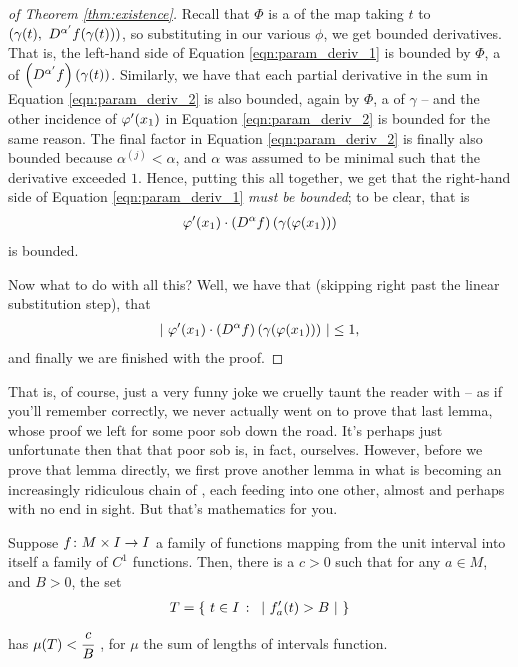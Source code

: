 \begin{proof}[of Theorem \ref{thm:existence}]
    Recall that $\Phi$ is a \cellrparam of the map taking $t$ to $(\gamma(t), \ D^{\alpha^{\prime}} f(\gamma(t)))$, so substituting in our various $\phi$, we get bounded derivatives. That is, the left-hand side of Equation \ref{eqn:param_deriv_1} is bounded by $\Phi$, a \cellrparam of $\left( D^{\alpha^{\prime}} f \right)(\gamma(t))$. Similarly, we have that each partial derivative in the sum in Equation \ref{eqn:param_deriv_2} is also bounded, again by $\Phi$, a \cellrparam of $\gamma$ -- and the other incidence of $\varphi^{\prime}(x_1)$ in Equation \ref{eqn:param_deriv_2} is bounded for the same reason. The final factor in Equation \ref{eqn:param_deriv_2} is finally also bounded because $\alpha^{(j)} < \alpha$, and $\alpha$ was assumed to be minimal such that the derivative exceeded $1$. Hence, putting this all together, we get that the right-hand side of Equation \ref{eqn:param_deriv_1} \emph{must be bounded}; to be clear, that is
      \begin{align*}
        \varphi^{\prime}(x_1) \cdot \left( D^{\alpha} f \right) \left( \gamma (\varphi(x_1)) \right)
      \end{align*}
    is bounded.

    Now what to do with all this? Well, we have that (skipping right past the linear substitution step), that
      \begin{align*}
        \left\vert \  \varphi^{\prime}(x_1) \cdot \left( D^{\alpha} f \right) \left( \gamma (\varphi(x_1)) \right)  \ \right\vert \leq 1,
      \end{align*}
      and finally we are finished with the proof.
    \end{proof}


That is, of course, just a very funny joke we cruelly taunt the reader with -- as if you'll remember correctly, we never actually went on to prove that last lemma, whose proof we left for some poor sob down the road. It's perhaps just unfortunate then that that poor sob is, in fact, ourselves. However, before we prove that lemma directly, we first prove another lemma in what is becoming an increasingly ridiculous chain of \lemmas, each feeding into one other, almost and perhaps with no end in sight. But that's mathematics for you.

\begin{lemma}
  Suppose $f \colon M \times I \to I$ a family of functions mapping from the unit interval into itself a  family of $C^1$ functions. Then, there is a $c > 0$ such that for any $a \in M$, and $B > 0$, the set
    \begin{align*}
      T = \left\{ \ t \in I \ \colon \ \lvrv{ \pri{f_a}(t) > B } \ \right\}
    \end{align*}
    has $\mu(T) < \cfrac{c}{B} \ $, for $\mu$ the sum of lengths of intervals function.
    \label{lem:small_lemma_in_support}
  \end{lemma}

